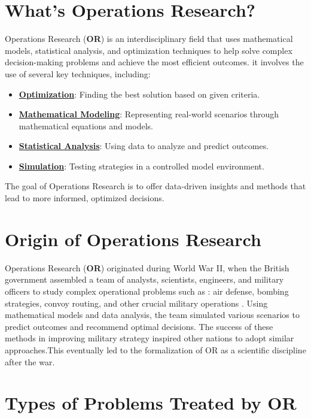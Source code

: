 \section{What's Operations Research?}
\begin{tcolorbox}[title=Definition]
Operations Research (\textbf{OR}) is an interdisciplinary field that uses mathematical models, statistical analysis, 
and optimization techniques to help solve complex decision-making problems and achieve the most efficient outcomes.
\noindent it involves the use of several key techniques, including:

\begin{itemize}
    \item \textbf{\underline{Optimization}}: Finding the best solution based on given criteria.
    \item \textbf{\underline{Mathematical Modeling}}: Representing real-world scenarios through mathematical equations and models.
    \item \textbf{\underline{Statistical Analysis}}: Using data to analyze and predict outcomes.
    \item \textbf{\underline{Simulation}}: Testing strategies in a controlled model environment.
\end{itemize}
The goal of Operations Research is to offer data-driven insights and methods that lead to more informed, optimized decisions.
\end{tcolorbox}

\section{Origin of Operations Research}

\begin{tcolorbox}[title=Origin]
Operations Research (\textbf{OR}) originated during World War II, when the British government assembled a team of analysts, 
scientists, engineers, and military officers to study complex operational problems such as : air defense, bombing strategies, 
convoy routing, and other crucial military operations . Using mathematical models and data analysis, the team simulated various scenarios 
to predict outcomes and recommend optimal decisions. The success of these methods in improving military strategy inspired 
other nations to adopt similar approaches.This eventually led to the formalization of OR as a scientific discipline after the war.
\end{tcolorbox}

\section{Types of Problems Treated by OR}

